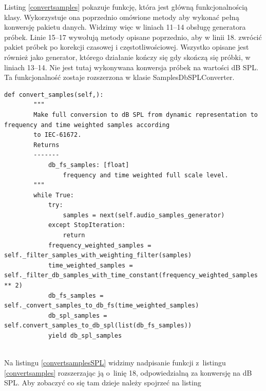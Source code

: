 \documentclass[eng,printmode]{mgr}
\begin{document}
Listing \ref{convertsamples} pokazuje funkcję, która jest główną funkcjonalnością klasy. Wykorzystuje ona poprzednio omówione metody aby wykonać pełną konwersję pakietu danych. Widzimy więc w liniach 11--14 obsługę generatora próbek. Linie 15--17 wywołują metody opisane poprzednio, aby w linii 18. zwrócić pakiet próbek po korekcji czasowej i częstotliwościowej. Wszystko opisane jest również jako generator, którego działanie kończy się gdy skończą się próbki, w liniach 13--14. Nie jest tutaj wykonywana konwersja próbek na wartości dB SPL. Ta funkcjonalność zostaje rozszerzona w klasie SamplesDbSPLConverter.

\begin{minipage}{\linewidth}
\begin{lstlisting}[caption={fragment kodu źródłowego pliku SampleSPLConverter.py, klasa SamplesDbSPLConverter, metoda convert\_samples},captionpos=b,label={convertsamplesSPL}]
    def convert_samples(self,):
        """
        Make full conversion to dB SPL from dynamic representation to frequency and time weighted samples according
        to IEC-61672.
        Returns
        -------
            db_fs_samples: [float]
                frequency and time weighted full scale level.
        """
        while True:
            try:
                samples = next(self.audio_samples_generator)
            except StopIteration:
                return
            frequency_weighted_samples = self._filter_samples_with_weighting_filter(samples)
            time_weighted_samples = self._filter_db_samples_with_time_constant(frequency_weighted_samples ** 2)
            db_fs_samples = self._convert_samples_to_db_fs(time_weighted_samples)
            db_spl_samples = self.convert_samples_to_db_spl(list(db_fs_samples))
            yield db_spl_samples
 
\end{lstlisting}
\end{minipage}



Na listingu \ref{convertsamplesSPL} widzimy nadpisanie funkcji z~listingu \ref{convertsamples} rozszerzając ją o~linię 18, odpowiedzialną za konwersję na dB SPL. Aby zobaczyć co się tam dzieje należy spojrzeć na listing 
\end{document}
